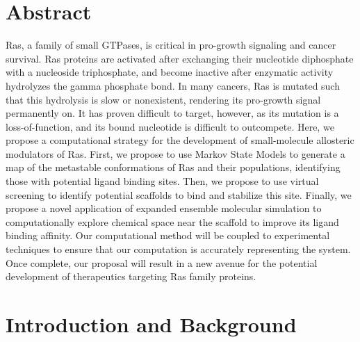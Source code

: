 \documentclass[12pt]{article}
\begin{document}
\section*{Abstract}
Ras, a family of small GTPases, is critical in pro-growth signaling and cancer survival. Ras proteins are activated after exchanging their nucleotide diphosphate with a nucleoside triphosphate, and become inactive after enzymatic activity hydrolyzes the gamma phosphate bond. In many cancers, Ras is mutated such that this hydrolysis is slow or nonexistent, rendering its pro-growth signal permanently on. It has proven difficult to target, however, as its mutation is a loss-of-function, and its bound nucleotide is difficult to outcompete. Here, we propose a computational strategy for the development of small-molecule allosteric modulators of Ras. First, we propose to use Markov State Models to generate a map of the metastable conformations of Ras and their populations, identifying those with potential ligand binding sites. Then, we propose to use virtual screening to identify potential scaffolds to bind and stabilize this site. Finally, we propose a novel application of expanded ensemble molecular simulation to computationally explore chemical space near the scaffold to improve its ligand binding affinity. Our computational method will be coupled to experimental techniques to ensure that our computation is accurately representing the system. Once complete, our proposal will result in a new avenue for the potential development of therapeutics targeting Ras family proteins. 


  \section*{Introduction and Background}
\end{document}
